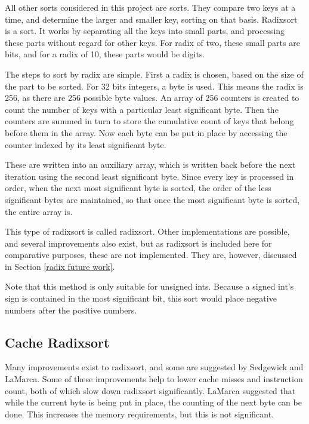 \label{radix}

All other sorts considered in this project are  sorts.
They compare two keys at a time, and determine the larger and smaller key,
sorting on that basis. Radixsort is a  sort. It works by
separating all the keys into small parts, and processing these parts without
regard for other keys. For radix of two, these small parts are bits, and for a
radix of 10, these parts would be digits. 

The steps to sort by radix are simple. First a radix is chosen, based on the
size of the part to be sorted. For 32 bits integers, a byte is used. This means
the radix is 256, as there are 256 possible byte values. An array of 256
counters is created to count the number of keys with a particular least
significant byte. Then the counters are summed in turn to store the cumulative
count of keys that belong before them in the array. Now each byte can be put in
place by accessing the counter indexed by its least significant byte.

These are written into an auxiliary array, which is written back before the next
iteration using the second least significant byte. Since every key is processed
in order, when the next most significant byte is sorted, the order of the less
significant bytes are maintained, so that once the most significant byte is
sorted, the entire array is.

This type of radixsort is called  radixsort.
Other implementations are possible, and several improvements also exist, but as
radixsort is included here for comparative purposes, these are not implemented.
They are, however, discussed in Section \ref{radix future work}.

Note that this method is only suitable for unsigned ints. Because a signed int's
sign is contained in the most significant bit, this sort would place negative
numbers after the positive numbers.

\subsection{Cache Radixsort}
Many improvements exist to radixsort, and some are suggested by Sedgewick and
LaMarca. Some of these improvements help to lower cache misses and instruction
count, both of which slow down radixsort significantly. LaMarca suggested
that while the current byte is being put in place, the counting of the next byte
can be done. This increases the memory requirements, but this is not
significant.

